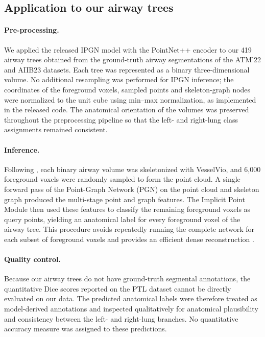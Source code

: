 \subsection{Application to our airway trees}
\label{sec:labeling_ours}
\label{sec:labeling_inference}

\paragraph{Pre-processing.}
We applied the released IPGN model with the PointNet++ encoder to our
419 airway trees obtained from the ground-truth airway segmentations of
the ATM'22 and AIIB23 datasets. Each tree was represented as a binary
three-dimensional volume. No additional resampling was performed for
IPGN inference; the coordinates of the foreground voxels, sampled points
and skeleton-graph nodes were normalized to the unit cube using min--max
normalization, as implemented in the released code. The anatomical
orientation of the volumes was preserved throughout the preprocessing
pipeline so that the left- and right-lung class assignments remained
consistent.

\paragraph{Inference.}
Following \citet{xie2025}, each binary airway volume was skeletonized
with VesselVio, and 6,000 foreground voxels were randomly sampled to
form the point cloud. A single forward pass of the Point-Graph Network
(PGN) on the point cloud and skeleton graph produced the multi-stage
point and graph features. The Implicit Point Module then used these
features to classify the remaining foreground voxels as query points,
yielding an anatomical label for every foreground voxel of the airway
tree. This procedure avoids repeatedly running the complete network for
each subset of foreground voxels and provides an efficient dense
reconstruction \cite{xie2025}.

\paragraph{Quality control.}
Because our airway trees do not have ground-truth segmental annotations,
the quantitative Dice scores reported on the PTL dataset cannot be
directly evaluated on our data. The predicted anatomical labels were
therefore treated as model-derived annotations and inspected qualitatively
for anatomical plausibility and consistency between the left- and
right-lung branches. No quantitative accuracy measure was assigned to
these predictions.

